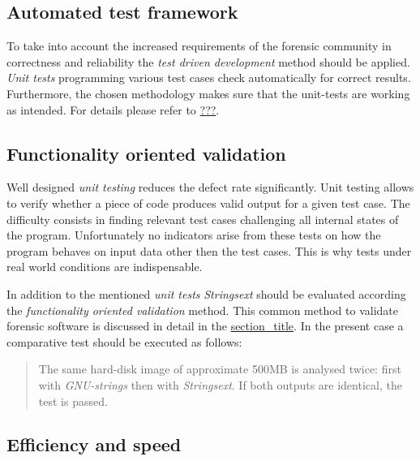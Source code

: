 \hypertarget{automated-test-framework}{\subsection{Automated test
framework}\label{automated-test-framework}}

To take into account the increased requirements of the forensic
community in correctness and reliability the \emph{test driven
development} method should be applied. \emph{Unit tests} programming
various test cases check automatically for correct results. Furthermore,
the chosen methodology makes sure that the unit-tests are working as
intended. For details please refer to
\protect\hyperlink{dev-process}{???}.

\hypertarget{functionality-oriented-validation}{\subsection{Functionality
oriented validation}\label{functionality-oriented-validation}}

Well designed \emph{unit testing} reduces the defect rate significantly.
Unit testing allows to verify whether a piece of code produces valid
output for a given test case. The difficulty consists in finding
relevant test cases challenging all internal states of the program.
Unfortunately no indicators arise from these tests on how the program
behaves on input data other then the test cases. This is why tests under
real world conditions are indispensable.

In addition to the mentioned \emph{unit tests} \emph{Strings­ext} should
be evaluated according the \emph{functionality oriented validation}
method. This common method to validate forensic software is discussed in
detail in the \protect\hyperlink{_tool_validation}{section\_title}. In
the present case a comparative test should be executed as follows:

\begin{quote}
The same hard-disk image of approximate 500MB is analysed twice: first
with \emph{GNU-strings} then with \emph{Strings­ext}. If both outputs
are identical, the test is passed.
\end{quote}

\hypertarget{efficiency-and-speed}{\subsection{Efficiency and
speed}\label{efficiency-and-speed}}

